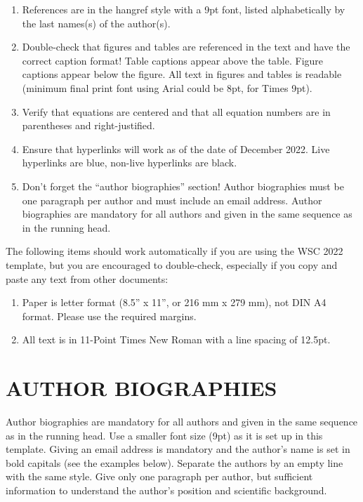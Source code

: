 \documentclass{wscpaperproc}
\theoremstyle{wsc}
\begin{document}
\begin{enumerate}
\item References are in the hangref style with a 9pt font, listed alphabetically by the last names(s) of the author(s).
\item Double-check that figures and tables are referenced in the text and have the correct caption format! Table captions appear above the table. Figure captions appear below the figure. All text in figures and tables is readable (minimum final print font using Arial could be 8pt, for Times 9pt).
\item Verify that equations are centered and that all equation numbers are in parentheses and right-justified.
\item Ensure that hyperlinks will work as of the date of December 2022. Live hyperlinks are blue, non-live hyperlinks are black.
\item	Don’t forget the ``author biographies'' section! Author biographies must be one paragraph per author and must include an email address. Author biographies are mandatory for all authors and given in the same sequence as in the running head. 
\end{enumerate}

The following items should work automatically if you are using the WSC 2022 template, but you are encouraged to double-check, especially if you copy and paste any text from other documents:

\begin{enumerate}
\item Paper is letter format (8.5'' x 11'', or 216 mm x 279 mm), not DIN A4 format. Please use the required margins. 
\item All text is in 11-Point Times New Roman with a line spacing of 12.5pt.
\end{enumerate}

\footnotesize






\section*{AUTHOR BIOGRAPHIES}

{\normalsize Author biographies are mandatory for all authors and given in the same sequence as in the running head. Use a smaller font size (9pt) as it is set up in this template. Giving an email address is mandatory and the author’s name is set in bold capitals (see the examples below). Separate the authors by an empty line with the same style. Give only one paragraph per author, but sufficient information to understand the author’s position and scientific background.}\\
\end{document}
